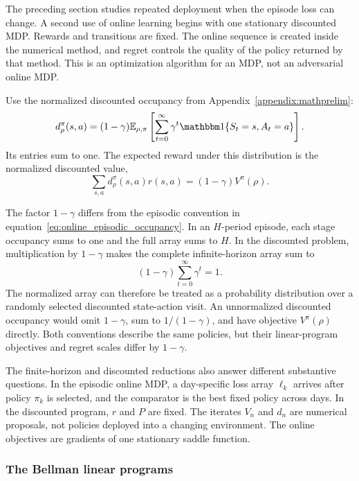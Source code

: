 The preceding section studies repeated deployment when the episode loss can change. A second use of online learning begins with one stationary discounted MDP. Rewards and transitions are fixed. The online sequence is created inside the numerical method, and regret controls the quality of the policy returned by that method. This is an optimization algorithm for an MDP, not an adversarial online MDP.

Use the normalized discounted occupancy from Appendix~\ref{appendix:mathprelim}:
\begin{equation}
d_\rho^\pi(s,a)
=
(1-\gamma)
\mathbb E_{\rho,\pi}
\left[
\sum_{t=0}^\infty
\gamma^t\indicator{S_t=s,A_t=a}
\right].
\label{eq:online_discounted_occupancy}
\end{equation}
Its entries sum to one. The expected reward under this distribution is the normalized discounted value,
\begin{equation}
\sum_{s,a}d_\rho^\pi(s,a)r(s,a)
=
(1-\gamma)V^\pi(\rho).
\label{eq:online_normalized_value}
\end{equation}

The factor $1-\gamma$ differs from the episodic convention in equation~\eqref{eq:online_episodic_occupancy}. In an $H$-period episode, each stage occupancy sums to one and the full array sums to $H$. In the discounted problem, multiplication by $1-\gamma$ makes the complete infinite-horizon array sum to
\[
(1-\gamma)\sum_{t=0}^\infty\gamma^t=1.
\]
The normalized array can therefore be treated as a probability distribution over a randomly selected discounted state-action visit. An unnormalized discounted occupancy would omit $1-\gamma$, sum to $1/(1-\gamma)$, and have objective $V^\pi(\rho)$ directly. Both conventions describe the same policies, but their linear-program objectives and regret scales differ by $1-\gamma$.

The finite-horizon and discounted reductions also answer different substantive questions. In the episodic online MDP, a day-specific loss array $\ell_k$ arrives after policy $\pi_k$ is selected, and the comparator is the best fixed policy across days. In the discounted program, $r$ and $P$ are fixed. The iterates $V_n$ and $d_n$ are numerical proposals, not policies deployed into a changing environment. The online objectives are gradients of one stationary saddle function.

\subsubsection{The Bellman linear programs}

